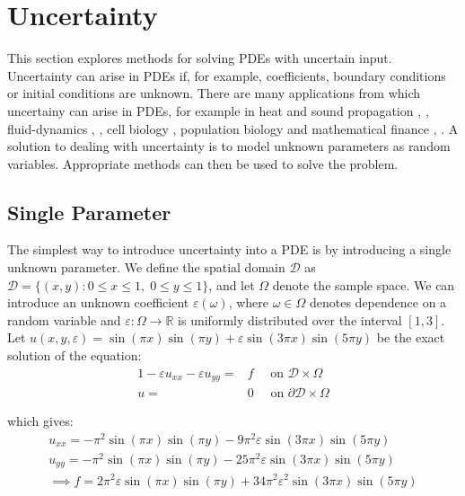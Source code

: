 \documentclass[11pt]{article}
\numberwithin{equation}{section}
\begin{document}
\newpage

\section{Uncertainty}
This section explores methods for solving PDEs with uncertain input. Uncertainty can arise in PDEs if, for example, coefficients, boundary conditions or initial conditions are unknown. There are many applications from which uncertainy can arise in PDEs, for example in heat and sound propagation \cite{Swanson}, \cite{Pryhara}, fluid-dynamics \cite{Breit}, \cite{Holm}, cell biology \cite{Bressloff}, population biology \cite{Edwards} and mathematical finance \cite{Shreve03}, \cite{Shreve04}. A solution to dealing with uncertainty is to model unknown parameters as random variables. Appropriate methods can then be used to solve the problem. 

\subsection{Single Parameter}
The simplest way to introduce uncertainty into a PDE is by introducing a single unknown parameter. We define the spatial domain $\mathcal{D}$ as $\mathcal{D} = \{(x,y) : 0 \leq x \leq 1, \; 0 \leq y \leq 1 \}$, and let $\Omega$ denote the sample space. We can introduce an unknown coefficient $\varepsilon(\omega)$, where $\omega \in \Omega$ denotes dependence on a random variable and $\varepsilon: \Omega \rightarrow \mathbb{R}$ is uniformly distributed over the interval $[1,3]$. Let $u(x,y,\varepsilon) = \sin(\pi x)\sin(\pi y) + \varepsilon \sin(3 \pi x) \sin(5 \pi y)$ be the exact solution of the equation:
\begin{alignat}{1}
-\varepsilon u_{xx} -\varepsilon u_{yy} = {}& f \quad \text{ on } \mathcal{D} \times \Omega \nonumber \\
u = {}& 0 \quad \text{ on } \partial \mathcal{D} \times \Omega
\end{alignat}

which gives:
\begin{equation}
\begin{split}
u_{xx} = -\pi^2 \sin(\pi x) \sin(\pi y) - 9\pi^2 \varepsilon \sin(3\pi x) \sin(5\pi y) \\
u_{yy} = -\pi^2 \sin(\pi x) \sin(\pi y) - 25\pi^2 \varepsilon \sin(3\pi x) \sin(5\pi y) \\
\implies f = 2\pi^2 \varepsilon \sin(\pi x) \sin(\pi y) + 34\pi^2 \varepsilon^2 \sin(3\pi x) \sin(5\pi y)
\end{split}
\end{equation}
\end{document}
